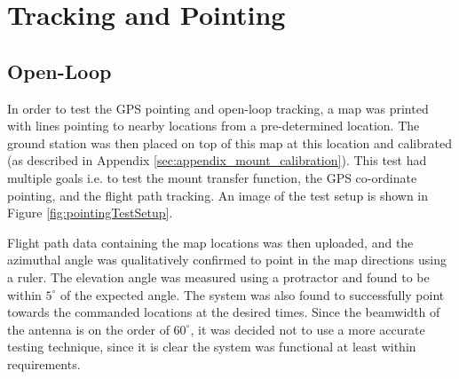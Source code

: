 \graphicspath{{./figures}}

\section{Tracking and Pointing}

\subsection{Open-Loop}

In order to test the GPS pointing and open-loop tracking, a map was printed with lines pointing to nearby locations from a pre-determined location. The ground station was then placed on top of this map at this location and calibrated (as described in Appendix \ref{sec:appendix_mount_calibration}). This test had multiple goals i.e. to test the mount transfer function, the GPS co-ordinate pointing, and the flight path tracking. An image of the test setup is shown in Figure \ref{fig:pointingTestSetup}.

Flight path data containing the map locations was then uploaded, and the azimuthal angle was qualitatively confirmed to point in the map directions using a ruler. The elevation angle was measured using a protractor and found to be within $5^\circ$ of the expected angle. The system was also found to successfully point towards the commanded locations at the desired times. Since the beamwidth of the antenna is on the order of $60^\circ$, it was decided not to use a more accurate testing technique, since it is clear the system was functional at least within requirements.

